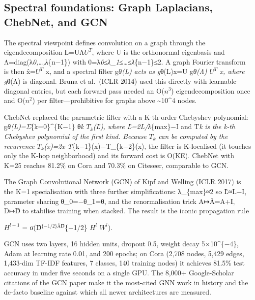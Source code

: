 \documentclass{article}
\providecommand{\textsuperscript}[1]{\ensuremath{^{\text{#1}}}}
\begin{document}
\subsection{Spectral foundations: Graph Laplacians, ChebNet, and GCN}\label{spectral-foundations-graph-laplacians-chebnet-and-gcn}

The spectral viewpoint defines convolution on a graph through the eigendecomposition L=UΛ\(U^T\), where U is the orthonormal eigenbasis and Λ=diag(λ\emph{0,\ldots,λ}\{n−1\}) with 0=λ\emph{0≤λ\_1≤\ldots≤λ}\{n−1\}≤2. A graph Fourier transform is then x̂=\(U^T\) x, and a spectral filter g\emph{θ(L) acts as g}θ(L)x=U g\emph{θ(Λ) \(U^T\) x, where g}θ(Λ) is diagonal. Bruna et al.~(ICLR 2014) used this directly with learnable diagonal entries, but each forward pass needed an O(\(n^3\)) eigendecomposition once and O(\(n^2\)) per filter---prohibitive for graphs above \textasciitilde10\^{}4 nodes.

ChebNet \citep{defferrard2016convolutionalneura} replaced the parametric filter with a K-th-order Chebyshev polynomial: g\emph{θ(L)=Σ}\{k=0\}\^{}\{K−1\} θ\emph{k \(T_k\)(L̃), where L̃=2L/λ}\{max\}−I and T\emph{k is the k-th Chebyshev polynomial of the first kind. Because \(T_k\) can be computed by the recurrence \(T_k\)(x)=2x T}\{k−1\}(x)−T\_\{k−2\}(x), the filter is K-localised (it touches only the K-hop neighborhood) and its forward cost is O(K\textbar E\textbar). ChebNet with K=25 reaches 81.2\% on Cora and 70.3\% on Citeseer, comparable to GCN.

The Graph Convolutional Network (GCN) of Kipf and Welling (ICLR 2017) is the K=1 specialisation with three further simplifications: λ\_\{max\}≈2 so L̃≈L−I, parameter sharing θ\_0=−θ\_1=θ, and the renormalisation trick A↦Ã=A+I, D↦D̃ to stabilise training when stacked. The result is the iconic propagation rule

\(H^{l+1}\) = σ(D̃\textsuperscript{\{−1/2\}ÃD̃}\{−1/2\} \(H^l\) \(W^l\)).

GCN uses two layers, 16 hidden units, dropout 0.5, weight decay 5×10\^{}\{−4\}, Adam at learning rate 0.01, and 200 epochs; on Cora (2,708 nodes, 5,429 edges, 1,433-dim TF-IDF features, 7 classes, 140 training nodes) it achieves 81.5\% test accuracy in under five seconds on a single GPU. The 8,000+ Google-Scholar citations of the GCN paper make it the most-cited GNN work in history and the de-facto baseline against which all newer architectures are measured.
\end{document}
